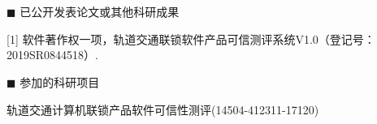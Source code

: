 \newpage
\section*{}
\vskip 5mm



{\heiti $\blacksquare$ 已公开发表论文或其他科研成果}\vskip 5mm
\begin{flushleft}

[1] 软件著作权一项，轨道交通联锁软件产品可信测评系统V1.0（登记号：2019SR0844518）.

\end{flushleft}

{\heiti $\blacksquare$ 参加的科研项目}\vskip 5mm
\begin{flushleft}	
	[1] 轨道交通计算机联锁产品软件可信性测评(14504-412311-17120)		
\end{flushleft}